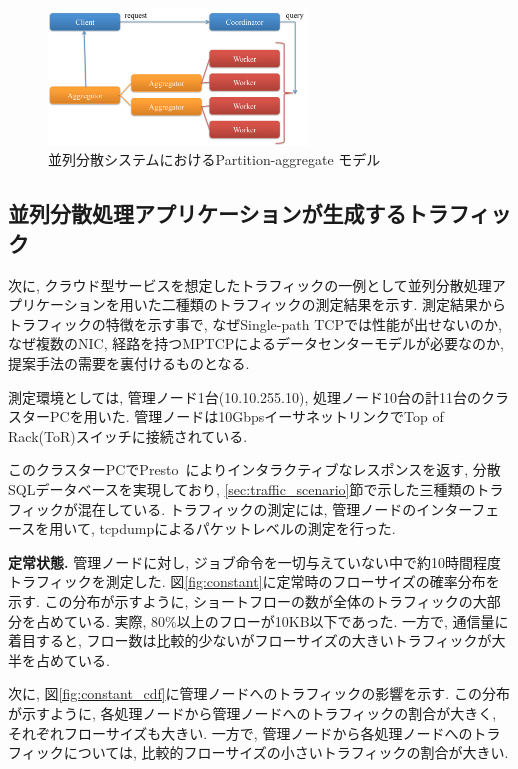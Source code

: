 \documentclass[11pt, a4paper, twocolumn]{jsarticle}
\begin{document}
\begin{figure}[h]
    \begin{center}
    \includegraphics[autoebb, width=195pt]{./img/part_aggr.pdf}
    \caption{並列分散システムにおけるPartition-aggregate モデル}
    \label{fig:part_aggr}
    \end{center}
\end{figure}

\subsection{並列分散処理アプリケーションが生成するトラフィック}
\label{sec:traffic_character}
次に, クラウド型サービスを想定したトラフィックの一例として並列分散処理アプリケーションを用いた二種類のトラフィックの測定結果を示す.
測定結果からトラフィックの特徴を示す事で, なぜSingle-path TCPでは性能が出せないのか, なぜ複数のNIC,
経路を持つMPTCPによるデータセンターモデルが必要なのか, 提案手法の需要を裏付けるものとなる.

測定環境としては, 管理ノード1台(10.10.255.10), 処理ノード10台の計11台のクラスターPCを用いた.
管理ノードは10GbpsイーサネットリンクでTop of Rack(ToR)スイッチに接続されている.

このクラスターPCでPresto~\cite{presto}によりインタラクティブなレスポンスを返す, 分散SQLデータベースを実現しており,
\ref{sec:traffic_scenario}節で示した三種類のトラフィックが混在している.
トラフィックの測定には, 管理ノードのインターフェースを用いて, tcpdumpによるパケットレベルの測定を行った.

{\bf 定常状態. }
管理ノードに対し, ジョブ命令を一切与えていない中で約10時間程度トラフィックを測定した.
図\ref{fig:constant}に定常時のフローサイズの確率分布を示す.
この分布が示すように, ショートフローの数が全体のトラフィックの大部分を占めている.
実際, 80\%以上のフローが10KB以下であった.
一方で, 通信量に着目すると, フロー数は比較的少ないがフローサイズの大きいトラフィックが大半を占めている.

次に, 図\ref{fig:constant_cdf}に管理ノードへのトラフィックの影響を示す.
この分布が示すように, 各処理ノードから管理ノードへのトラフィックの割合が大きく, それぞれフローサイズも大きい.
一方で, 管理ノードから各処理ノードへのトラフィックについては, 比較的フローサイズの小さいトラフィックの割合が大きい.
\end{document}
